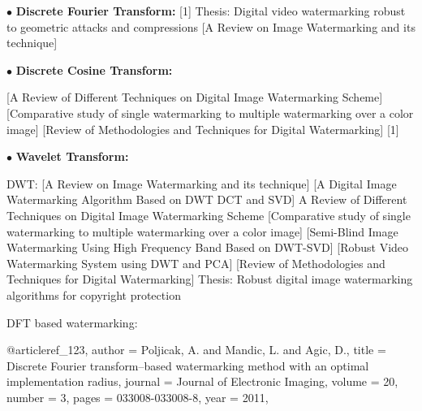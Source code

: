 

\noindent $\bullet$ {\bf Discrete Fourier Transform:}
[1]
Thesis: Digital video watermarking robust to geometric attacks and compressions
[A Review on Image Watermarking and its technique]

\noindent $\bullet$ {\bf Discrete Cosine Transform:}

[A Review of Different Techniques on Digital Image Watermarking Scheme]
[Comparative study of single watermarking to multiple watermarking over a color image]
[Review of Methodologies and Techniques for Digital Watermarking]
[1]

\noindent $\bullet$ {\bf Wavelet Transform:}
\label{sec:DTCWT}

DWT:
[A Review on Image Watermarking and its technique]
[A Digital Image Watermarking Algorithm Based on DWT DCT and SVD]
A Review of Different Techniques on Digital Image Watermarking Scheme
[Comparative study of single watermarking to multiple watermarking over a color image]
[Semi-Blind Image Watermarking Using High Frequency Band Based on DWT-SVD]
[Robust Video Watermarking System using DWT and PCA]
[Review of Methodologies and Techniques for Digital Watermarking]
Thesis: Robust digital image watermarking algorithms for copyright protection


DFT based watermarking:

@article{ref_123,
author = {Poljicak, A. and Mandic, L. and Agic, D.},
title = {Discrete Fourier transform–based watermarking method with an optimal implementation radius},
journal = {Journal of Electronic Imaging},
volume = {20},
number = {3},
pages = {033008-033008-8},
year = {2011},
}

